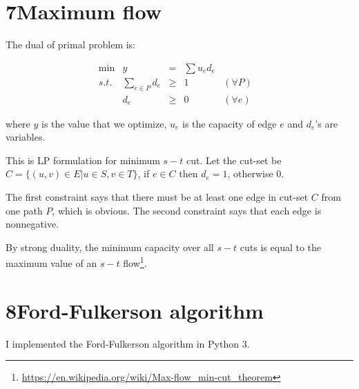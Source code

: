 \documentclass[a4paper,12pt]{article}
\begin{document}
\section*{7\quad Maximum flow}

The dual of primal problem is:

\[
\begin{array}{rrrrrrrrl}
\min & y & = &\sum u_ed_e & &\\
s.t. & \sum\limits_{e\in P}d_e & \geq & 1 & (\forall P)\\
& d_e & \geq& 0 & (\forall e)
\end{array}
\]

where $y$ is the value that we optimize, $u_e$ is the capacity of edge $e$ and $d_e$'s are variables.

This is LP formulation for minimum $s-t$ cut. Let the cut-set be $C=\{(u,v)\in E | u\in S, v\in T\}$, if $e\in C$ then $d_e=1$, otherwise 0.

The first constraint says that there must be at least one edge in cut-set $C$ from one path $P$, which is obvious. The second constraint says that each edge is nonnegative.

By strong duality, the minimum capacity over all $s-t$ cuts is equal to the maximum value of an $s-t$ flow\footnote{\href{https://en.wikipedia.org/wiki/Max-flow_min-cut_theorem}{https://en.wikipedia.org/wiki/Max-flow\_min-cut\_theorem}}.

\section*{8\quad Ford-Fulkerson algorithm}

I implemented the Ford-Fulkerson algorithm in Python 3.
\end{document}
